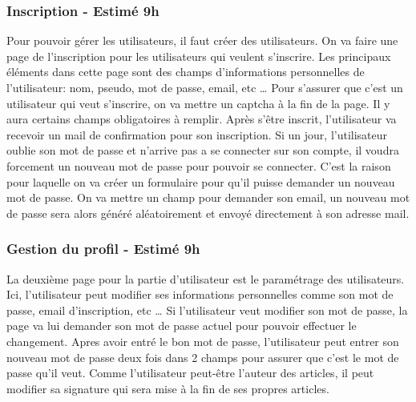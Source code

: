 		\subsubsection{Inscription - Estimé 9h}
		Pour pouvoir gérer les utilisateurs, il faut créer des utilisateurs. On va faire une page de l’inscription pour les utilisateurs qui veulent s’inscrire. Les principaux éléments dans cette page sont des champs d’informations personnelles de l’utilisateur: nom, pseudo, mot de passe, email, etc … Pour s'assurer que c’est un utilisateur qui veut s’inscrire, on va mettre un captcha à la fin de la page. Il y aura certains champs obligatoires à remplir. Après s’être inscrit, l’utilisateur va recevoir un mail de confirmation pour son inscription.
		Si un jour, l’utilisateur oublie son mot de passe et n’arrive pas a se connecter sur son compte, il voudra forcement un nouveau mot de passe pour pouvoir se connecter. C’est la raison pour laquelle on va créer un formulaire pour qu’il puisse demander un nouveau mot de passe. On va mettre un champ pour demander son email, un nouveau mot de passe sera alors généré aléatoirement et envoyé directement à son adresse mail. 


		\subsubsection{Gestion du profil - Estimé 9h}
		La deuxième page pour la partie d’utilisateur est le paramétrage des utilisateurs. Ici, l’utilisateur peut modifier ses informations personnelles comme son mot de passe, email d’inscription, etc … Si l’utilisateur veut modifier son mot de passe, la page va lui demander son mot de passe actuel pour pouvoir effectuer le changement. Apres avoir entré le bon mot de passe, l’utilisateur peut entrer son nouveau mot de passe deux fois dans 2 champs pour assurer que c’est le mot de passe qu’il veut. Comme l’utilisateur peut-être l’auteur des articles, il peut modifier sa signature qui sera mise à la fin de ses propres articles.
